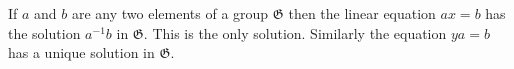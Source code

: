 If $a$ and $b$ are any two elements of a group $\mathfrak{G}$ then the linear equation $ax = b$ has the solution $a^{-1}b$ in $\mathfrak{G}$. This is the only solution. Similarly the equation $ya = b$ has a unique solution in $\mathfrak{G}$.
